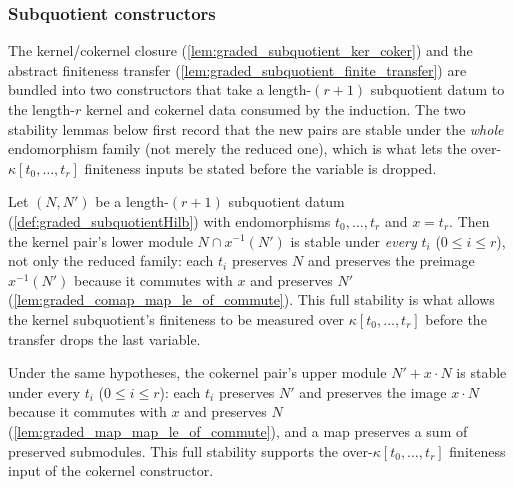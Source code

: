 \subsubsection*{Subquotient constructors}

The kernel/cokernel closure (\cref{lem:graded_subquotient_ker_coker}) and the
abstract finiteness transfer (\cref{lem:graded_subquotient_finite_transfer}) are
bundled into two constructors that take a length-\((r+1)\) subquotient datum to the
length-\(r\) kernel and cokernel data consumed by the induction. The two stability
lemmas below first record that the new pairs are stable under the \emph{whole}
endomorphism family (not merely the reduced one), which is what lets the over-\(\kappa[t_0,\dots,t_r]\)
finiteness inputs be stated before the variable is dropped.

\begin{lemma}\leanok
  \label{lem:graded_ker_stable_full}
  Let \((N, N')\) be a length-\((r+1)\) subquotient datum
  (\cref{def:graded_subquotientHilb}) with endomorphisms \(t_0, \dots, t_r\) and
  \(x = t_r\). Then the kernel pair's lower module \(N \cap x^{-1}(N')\) is stable
  under \emph{every} \(t_i\) (\(0 \le i \le r\)), not only the reduced family: each
  \(t_i\) preserves \(N\) and preserves the preimage \(x^{-1}(N')\) because it
  commutes with \(x\) and preserves \(N'\)
  (\cref{lem:graded_comap_map_le_of_commute}). This full stability is what allows the
  kernel subquotient's finiteness to be measured over \(\kappa[t_0, \dots, t_r]\)
  before the transfer drops the last variable.
\end{lemma}

\begin{lemma}\leanok
  \label{lem:graded_coker_stable_full}
  Under the same hypotheses, the cokernel pair's upper module \(N' + x \cdot N\) is
  stable under every \(t_i\) (\(0 \le i \le r\)): each \(t_i\) preserves \(N'\) and
  preserves the image \(x \cdot N\) because it commutes with \(x\) and preserves
  \(N\) (\cref{lem:graded_map_map_le_of_commute}), and a map preserves a sum of
  preserved submodules. This full stability supports the over-\(\kappa[t_0, \dots,
  t_r]\) finiteness input of the cokernel constructor.
\end{lemma}

